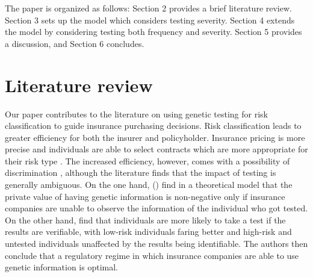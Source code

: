 \documentclass[nonatbib,preprint,12pt]{elsarticle}
\theoremstyle{plain}
\theoremstyle{definition}
\theoremstyle{plain}
\theoremstyle{TheoremNum}
\theoremstyle{CorollaryNum}
\theoremstyle{PropositionNum}
\theoremstyle{TheoremNum}
\begin{document}

The paper is organized as follows: Section 2 provides a brief literature review. Section 3 sets up the model which considers testing severity. Section 4 extends the model by considering testing both frequency and severity. Section 5 provides a discussion, and Section 6 concludes.

\section{Literature review}

Our paper contributes to the literature on using genetic testing for risk classification to guide insurance purchasing decisions. Risk classification leads to greater efficiency for both the insurer and policyholder. Insurance pricing is more precise and individuals are able to select contracts which are more appropriate for their risk type \autocite{finkelstein2004adverse}. The increased efficiency, however, comes with a possibility of discrimination \autocite{crocker1986efficiency}, although the literature finds that the impact of testing is generally ambiguous. On the one hand, \citeauthor{doherty1996adverse} (\citeyear{doherty1996adverse}) find in a theoretical model that the private value of having genetic information is non-negative only if insurance companies are unable to observe the information of the individual who got tested. On the other hand, \textcite{hoel2006genetic} find that individuals are more likely to take a test if the results are verifiable, with low-risk individuals faring better and high-risk and untested individuals unaffected by the results being identifiable. The authors then conclude that a regulatory regime in which insurance companies are able to use genetic information is optimal. 
\end{document}
